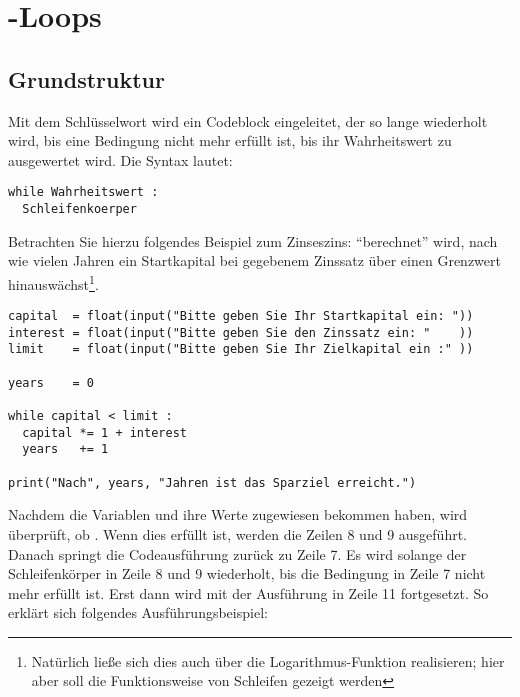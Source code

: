 \section{-Loops}
\subsection{Grundstruktur}
Mit dem Schlüsselwort  wird ein Codeblock eingeleitet, der so lange wiederholt wird, bis eine Bedingung nicht mehr erfüllt ist, \ie bis ihr Wahrheitswert zu  ausgewertet wird. Die Syntax lautet:

\begin{codebox}
\begin{verbatim}
while Wahrheitswert :
  Schleifenkoerper
\end{verbatim}
\end{codebox}

Betrachten Sie hierzu folgendes Beispiel zum Zinseszins: \enquote{berechnet} wird, nach wie vielen Jahren ein Startkapital bei gegebenem Zinssatz über einen Grenzwert hinauswächst\footnote{Natürlich ließe sich dies auch über die Logarithmus-Funktion realisieren; hier aber soll die Funktionsweise von Schleifen gezeigt werden}.

\begin{codebox}
\begin{verbatim}
capital  = float(input("Bitte geben Sie Ihr Startkapital ein: "))
interest = float(input("Bitte geben Sie den Zinssatz ein: "    ))
limit    = float(input("Bitte geben Sie Ihr Zielkapital ein :" ))

years    = 0

while capital < limit :
  capital *= 1 + interest
  years   += 1

print("Nach", years, "Jahren ist das Sparziel erreicht.")
\end{verbatim}
\end{codebox}

Nachdem die Variablen  und  ihre Werte zugewiesen bekommen haben, wird überprüft, ob . Wenn dies erfüllt ist, werden die Zeilen 8 und 9 ausgeführt. Danach springt die Codeausführung zurück zu Zeile 7. Es wird solange der Schleifenkörper in Zeile 8 und 9 wiederholt, bis die Bedingung in Zeile 7 nicht mehr erfüllt ist. Erst dann wird mit der Ausführung in Zeile 11 fortgesetzt. So erklärt sich folgendes Ausführungsbeispiel:

